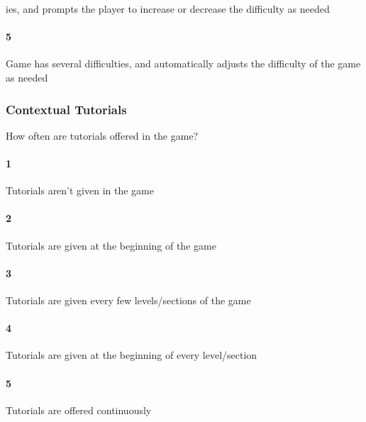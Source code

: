 ies, and prompts the player to increase or decrease the difficulty as needed\paragraph{5}Game has several difficulties, and automatically adjusts the difficulty of the game as needed\subsubsection{Contextual Tutorials}How often are tutorials offered in the game?\paragraph{1}Tutorials aren't given in the game\paragraph{2}Tutorials are given at the beginning of the game\paragraph{3}Tutorials are given every few levels/sections of the game\paragraph{4}Tutorials are given at the beginning of every level/section\paragraph{5}Tutorials are offered continuously